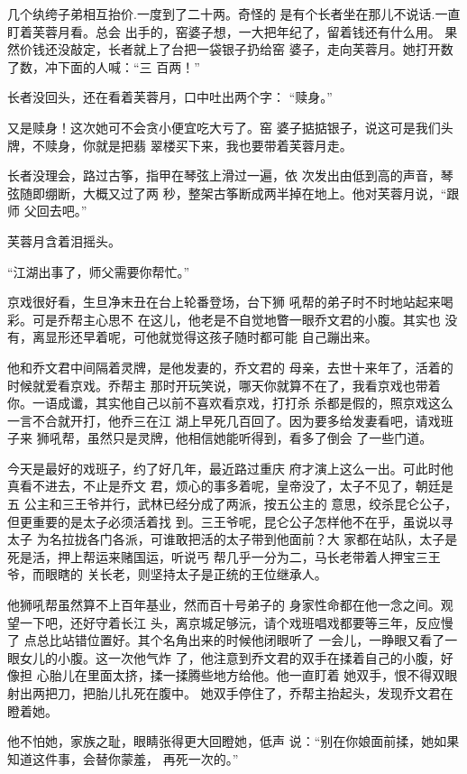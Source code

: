 几个纨绔子弟相互抬价.一度到了二十两。奇怪的
是有个长者坐在那儿不说话.一直盯着芙蓉月看。总会
出手的，窑婆子想，一大把年纪了，留着钱还有什么用。
果然价钱还没敲定，长者就上了台把一袋银子扔给窑
婆子，走向芙蓉月。她打开数了数，冲下面的人喊：“三
百两！”

长者没回头，还在看着芙蓉月，口中吐出两个字：
“赎身。”

又是赎身！这次她可不会贪小便宜吃大亏了。窑
婆子掂掂银子，说这可是我们头牌，不赎身，你就是把翡
翠楼买下来，我也要带着芙蓉月走。

长者没理会，路过古筝，指甲在琴弦上滑过一遍，依
次发出由低到高的声音，琴弦随即绷断，大概又过了两
秒，整架古筝断成两半掉在地上。他对芙蓉月说，“跟师
父回去吧。”

芙蓉月含着泪摇头。

“江湖出事了，师父需要你帮忙。”
\newline

京戏很好看，生旦净末丑在台上轮番登场，台下狮
吼帮的弟子时不时地站起来喝彩。可是乔帮主心思不
在这儿，他老是不自觉地瞥一眼乔文君的小腹。其实也
没有，离显形还早着呢，可他就觉得这孩子随时都可能
自己蹦出来。

他和乔文君中间隔着灵牌，是他发妻的，乔文君的
母亲，去世十来年了，活着的时候就爱看京戏。乔帮主
那时开玩笑说，哪天你就算不在了，我看京戏也带着
你。一语成谶，其实他自己以前不喜欢看京戏，打打杀
杀都是假的，照京戏这么一言不合就开打，他乔三在江
湖上早死几百回了。因为要多给发妻看吧，请戏班子来
狮吼帮，虽然只是灵牌，他相信她能听得到，看多了倒会
了一些门道。

今天是最好的戏班子，约了好几年，最近路过重庆
府才演上这么一出。可此时他真看不进去，不止是乔文
君，烦心的事多着呢，皇帝没了，太子不见了，朝廷是五
公主和三王爷并行，武林已经分成了两派，按五公主的
意思，绞杀昆仑公子，但更重要的是太子必须活着找
到。三王爷呢，昆仑公子怎样他不在乎，虽说以寻太子
为名拉拢各门各派，可谁敢把活的太子带到他面前？大
家都在站队，太子是死是活，押上帮运来赌国运，听说丐
帮几乎一分为二，马长老带着人押宝三王爷，而眼瞎的
关长老，则坚持太子是正统的王位继承人。

他狮吼帮虽然算不上百年基业，然而百十号弟子的
身家性命都在他一念之间。观望一下吧，还好守着长江
头，离京城足够沅，请个戏班唱戏都要等三年，反应慢了
点总比站错位置好。其个名角出来的时候他闭眼听了
一会儿，一睁眼又看了一眼女儿的小腹。这一次他气炸
了，他注意到乔文君的双手在揉着自己的小腹，好像担
心胎儿在里面太挤，揉一揉腾些地方给他。他一直盯着
她双手，恨不得双眼射出两把刀，把胎儿扎死在腹中。
她双手停住了，乔帮主抬起头，发现乔文君在瞪着她。

他不怕她，家族之耻，眼睛张得更大回瞪她，低声
说：“别在你娘面前揉，她如果知道这件事，会替你蒙羞，
再死一次的。”

